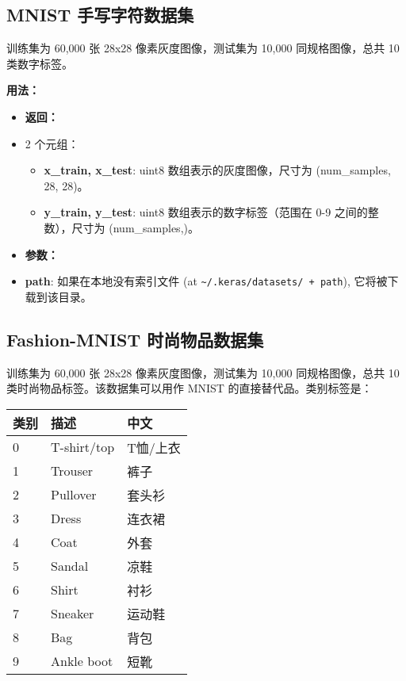 \subsection{MNIST
手写字符数据集}\label{mnist-ux624bux5199ux5b57ux7b26ux6570ux636eux96c6}

训练集为 60,000 张 28x28 像素灰度图像，测试集为 10,000 同规格图像，总共
10 类数字标签。

\textbf{用法：}\label{ux7528ux6cd5-4}

\begin{Shaded}
\begin{Highlighting}[]
  

\OperatorTok{=} 
\end{Highlighting}
\end{Shaded}

\begin{itemize}
\tightlist
\item
  \textbf{返回：}
\item
  2 个元组：

  \begin{itemize}
  \tightlist
  \item
    \textbf{x\_train, x\_test}: uint8 数组表示的灰度图像，尺寸为
    (num\_samples, 28, 28)。
  \item
    \textbf{y\_train, y\_test}: uint8 数组表示的数字标签（范围在 0-9
    之间的整数），尺寸为 (num\_samples,)。
  \end{itemize}
\item
  \textbf{参数：}
\item
  \textbf{path}: 如果在本地没有索引文件 (at
  \texttt{\textquotesingle{}\textasciitilde{}/.keras/datasets/\textquotesingle{}\ +\ path}),
  它将被下载到该目录。
\end{itemize}


\subsection{Fashion-MNIST
时尚物品数据集}\label{fashion-mnist-ux65f6ux5c1aux7269ux54c1ux6570ux636eux96c6}

训练集为 60,000 张 28x28 像素灰度图像，测试集为 10,000 同规格图像，总共
10 类时尚物品标签。该数据集可以用作 MNIST 的直接替代品。类别标签是：

\begin{longtable}[c]{@{}lll@{}}
\toprule
类别 & 描述 & 中文\tabularnewline
\midrule
\endhead
0 & T-shirt/top & T恤/上衣\tabularnewline
1 & Trouser & 裤子\tabularnewline
2 & Pullover & 套头衫\tabularnewline
3 & Dress & 连衣裙\tabularnewline
4 & Coat & 外套\tabularnewline
5 & Sandal & 凉鞋\tabularnewline
6 & Shirt & 衬衫\tabularnewline
7 & Sneaker & 运动鞋\tabularnewline
8 & Bag & 背包\tabularnewline
9 & Ankle boot & 短靴\tabularnewline
\bottomrule
\end{longtable}

